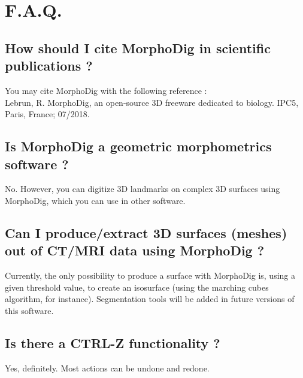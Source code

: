 
 \chapter{F.A.Q.}
		\minitoc  
    \section{How should I cite MorphoDig in scientific publications ?}
    You may  cite MorphoDig with the following reference :\\
		Lebrun, R. MorphoDig, an open-source 3D freeware dedicated to biology. IPC5, Paris, France; 07/2018.
    \section{Is MorphoDig a geometric morphometrics software ?}
    No. However, you can digitize 3D landmarks on complex 3D surfaces using MorphoDig, which you 
		can use in other software.
		\section{Can I produce/extract 3D surfaces (meshes) out of CT/MRI data using MorphoDig ?}
		Currently, the only possibility to produce a surface with MorphoDig is, using a given threshold value, to create an isosurface (using the marching cubes algorithm, for instance). Segmentation tools will be added in future versions of this software.
		\section{Is there a CTRL-Z functionality ?}
		Yes, definitely. Most actions can be undone and redone. 